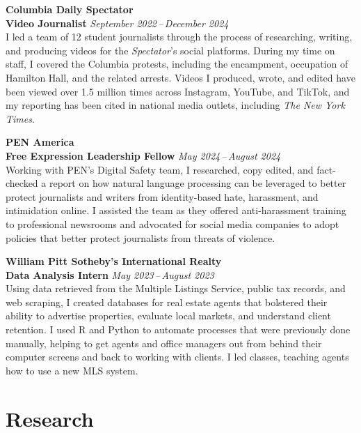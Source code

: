 \documentclass[11pt, letterpaper]{article}
\newcommand{\role}[2]{%
  \textbf{#1} \hfill \textit{#2}%
}
\newcommand{\employer}[1]{%
  \textbf{\large #1}%
}
\begin{document}
\vspace{4pt}
\employer{Columbia Daily Spectator}\\
\role{Video Journalist}{September 2022\,--\,December 2024}\\
I led a team of 12 student journalists through the process of researching, writing, and producing videos for the \textit{Spectator}'s social platforms. During my time on staff, I covered the Columbia protests, including the encampment, occupation of Hamilton Hall, and the related arrests. Videos I produced, wrote, and edited have been viewed over 1.5 million times across Instagram, YouTube, and TikTok, and my reporting has been cited in national media outlets, including \textit{The New York Times}.

\vspace{4pt}
\employer{PEN America}\\
\role{Free Expression Leadership Fellow}{May 2024\,--\,August 2024}\\
Working with PEN's Digital Safety team, I researched, copy edited, and fact-checked a report on how natural language processing can be leveraged to better protect journalists and writers from identity-based hate, harassment, and intimidation online. I assisted the team as they offered anti-harassment training to professional newsrooms and advocated for social media companies to adopt policies that better protect journalists from threats of violence.

\vspace{4pt}
\employer{William Pitt Sotheby's International Realty}\\
\role{Data Analysis Intern}{May 2023\,--\,August 2023}\\
Using data retrieved from the Multiple Listings Service, public tax records, and web scraping, I created databases for real estate agents that bolstered their ability to advertise properties, evaluate local markets, and understand client retention. I used R and Python to automate processes that were previously done manually, helping to get agents and office managers out from behind their computer screens and back to working with clients. I led classes, teaching agents how to use a new MLS system.

\section*{Research}
\end{document}
